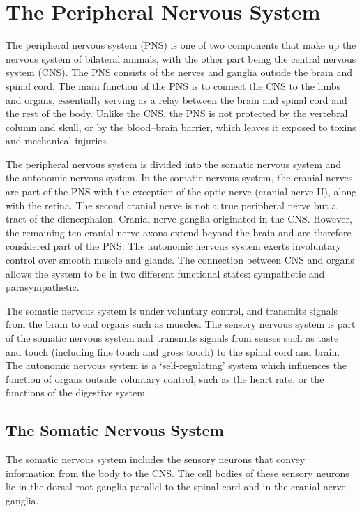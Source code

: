 \hypertarget{the-peripheral-nervous-system}{%
\chapter{The Peripheral Nervous System}\label{the-peripheral-nervous-system}}

The peripheral nervous system (PNS) is one of two components that make up the nervous system of bilateral animals, with the other part being the central nervous system (CNS). The PNS consists of the nerves and ganglia outside the brain and spinal cord. The main function of the PNS is to connect the CNS to the limbs and organs, essentially serving as a relay between the brain and spinal cord and the rest of the body. Unlike the CNS, the PNS is not protected by the vertebral column and skull, or by the blood--brain barrier, which leaves it exposed to toxins and mechanical injuries.

The peripheral nervous system is divided into the somatic nervous system and the autonomic nervous system. In the somatic nervous system, the cranial nerves are part of the PNS with the exception of the optic nerve (cranial nerve II), along with the retina. The second cranial nerve is not a true peripheral nerve but a tract of the diencephalon. Cranial nerve ganglia originated in the CNS. However, the remaining ten cranial nerve axons extend beyond the brain and are therefore considered part of the PNS. The autonomic nervous system exerts involuntary control over smooth muscle and glands. The connection between CNS and organs allows the system to be in two different functional states: sympathetic and parasympathetic.

The somatic nervous system is under voluntary control, and transmits signals from the brain to end organs such as muscles. The sensory nervous system is part of the somatic nervous system and transmits signals from senses such as taste and touch (including fine touch and gross touch) to the spinal cord and brain. The autonomic nervous system is a `self-regulating' system which influences the function of organs outside voluntary control, such as the heart rate, or the functions of the digestive system.

\hypertarget{the-somatic-nervous-system}{%
\section{The Somatic Nervous System}\label{the-somatic-nervous-system}}

The somatic nervous system includes the sensory neurons that convey information from the body to the CNS. The cell bodies of these sensory neurons lie in the dorsal root ganglia parallel to the spinal cord and in the cranial nerve ganglia.

